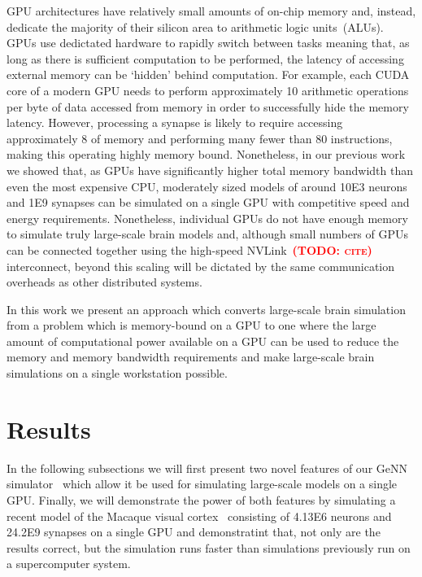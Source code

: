 \documentclass[9pt,twocolumn,twoside,lineno]{pnas-new}
\newcommand{\todo}[1]{\textbf{\textsc{\textcolor{red}{(TODO: #1)}}}}
\begin{document}
GPU architectures have relatively small amounts of on-chip memory and, instead, dedicate the majority of their silicon area to arithmetic logic units~(ALUs).
GPUs use dedictated hardware to rapidly switch between tasks meaning that, as long as there is sufficient computation to be performed, the latency of accessing external memory can be `hidden' behind computation.
For example, each CUDA core of a modern GPU needs to perform approximately 10 arithmetic operations per byte of data accessed from memory in order to successfully hide the memory latency.
However, processing a synapse is likely to require accessing approximately \SI{8}{\byte} of memory and performing many fewer than 80 instructions, making this operating highly memory bound.
Nonetheless, in our previous work~\citep{Knight2018} we showed that, as GPUs have significantly higher total memory bandwidth than even the most expensive CPU, moderately sized models of around \num{10E3} neurons and \num{1E9} synapses can be simulated on a single GPU with competitive speed and energy requirements.
Nonetheless, individual GPUs do not have enough memory to simulate truly large-scale brain models and, although small numbers of GPUs can be connected together using the high-speed NVLink~\todo{cite} interconnect, beyond this scaling will be dictated by the same communication overheads as other distributed systems.

In this work we present an approach which converts large-scale brain simulation from a problem which is memory-bound on a GPU to one where the large amount of computational power available on a GPU can be used to reduce the memory and memory bandwidth requirements and make large-scale brain simulations on a single workstation possible.

\section*{Results}
In the following subsections we will first present two novel features of our GeNN simulator~\citep{Yavuz2016} which allow it be used for simulating large-scale models on a single GPU.
Finally, we will demonstrate the power of both features by simulating a recent model of the Macaque visual cortex~\citep{Schmidt2018} consisting of \num{4.13E6} neurons and \num{24.2E9} synapses on a single GPU and demonstratint that, not only are the results correct, but the simulation runs faster than simulations previously run on a supercomputer system.
\end{document}
